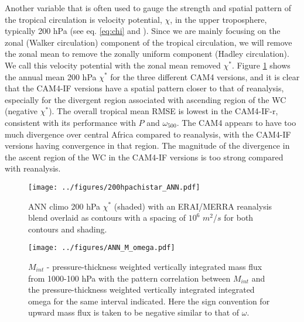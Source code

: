 \documentclass[letterpaper,12pt,titlepage,oneside,final]{book}
\begin{document}
Another variable that is often used to gauge the strength and spatial pattern of the tropical circulation is velocity potential, $\chi$, in the upper troposphere, typically 200 hPa (see eq. \ref{eq:chi} and \cite{tanaka_trend_2004}). Since we are mainly focusing on the zonal (Walker circulation) component of the tropical circulation, we will remove the zonal mean to remove the zonally uniform component (Hadley circulation). We call this velocity potential with the zonal mean removed $\chi^{*}$. Figure \ref{fig:chistar} shows the annual mean 200 hPa $\chi^{*}$ for the three different CAM4 versions, and it is clear that the CAM4-IF versions have a spatial pattern closer to that of reanalysis, especially for the divergent region associated with ascending region of the WC (negative $\chi^{*}$). The overall tropical mean RMSE is lowest in the CAM4-IF-r, consistent with its performance with $P$ and $\omega_{500}$. The CAM4 appears to have too much divergence over central Africa compared to reanalysis, with the CAM4-IF versions having convergence in that region. The magnitude of the divergence in the ascent region of the WC in the CAM4-IF versions is too strong compared with reanalysis.
\begin{figure}[H]
\centering
\noindent\texttt{[image: ../figures/200hpachistar\_ANN.pdf]}\hfill
\caption{ANN climo 200 hPa $\chi^{*}$ (shaded) with an ERAI/MERRA reanalysis blend overlaid as contours with a spacing of $10^{6}$ $m^{2}$/$s$ for both contours and shading.}
\label{fig:chistar}
\end{figure}
\begin{figure}[H]
\centering
\noindent\texttt{[image: ../figures/ANN\_M\_omega.pdf]}\hfill
\caption{$M_{int}$ - pressure-thickness weighted vertically integrated mass flux from 1000-100 hPa with the pattern correlation between $M_{int}$ and the pressure-thickness weighted vertically integrated integrated omega for the same interval indicated. Here the sign convention for upward mass flux is taken to be negative similar to that of $\omega$.}
\label{fig:mcomeg}
\end{figure}
\end{document}
